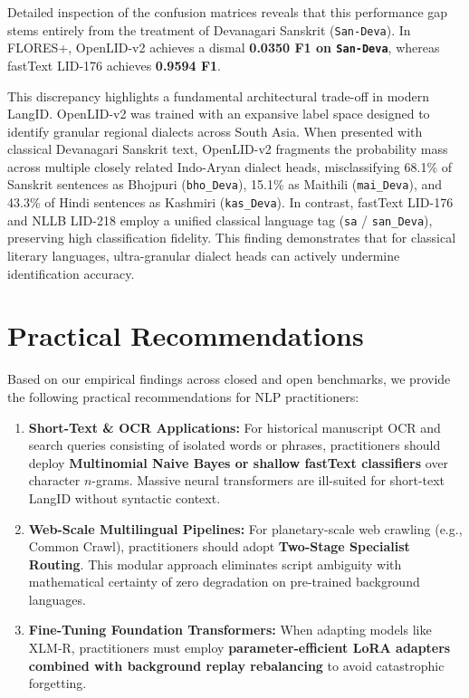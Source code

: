 \documentclass[11pt]{article}
\begin{document}
Detailed inspection of the confusion matrices reveals that this performance gap stems entirely from the treatment of Devanagari Sanskrit (\texttt{San-Deva}). In FLORES+, OpenLID-v2 achieves a dismal \textbf{0.0350 F1 on \texttt{San-Deva}}, whereas fastText LID-176 achieves \textbf{0.9594 F1}.

This discrepancy highlights a fundamental architectural trade-off in modern LangID. OpenLID-v2 was trained with an expansive label space designed to identify granular regional dialects across South Asia. When presented with classical Devanagari Sanskrit text, OpenLID-v2 fragments the probability mass across multiple closely related Indo-Aryan dialect heads, misclassifying 68.1\% of Sanskrit sentences as Bhojpuri (\texttt{bho\_Deva}), 15.1\% as Maithili (\texttt{mai\_Deva}), and 43.3\% of Hindi sentences as Kashmiri (\texttt{kas\_Deva}). In contrast, fastText LID-176 and NLLB LID-218 employ a unified classical language tag (\texttt{sa} / \texttt{san\_Deva}), preserving high classification fidelity. This finding demonstrates that for classical literary languages, ultra-granular dialect heads can actively undermine identification accuracy.

\section{Practical Recommendations}
Based on our empirical findings across closed and open benchmarks, we provide the following practical recommendations for NLP practitioners:
\begin{enumerate}
    \item \textbf{Short-Text \& OCR Applications:} For historical manuscript OCR and search queries consisting of isolated words or phrases, practitioners should deploy \textbf{Multinomial Naive Bayes or shallow fastText classifiers} over character $n$-grams. Massive neural transformers are ill-suited for short-text LangID without syntactic context.
    \item \textbf{Web-Scale Multilingual Pipelines:} For planetary-scale web crawling (e.g., Common Crawl), practitioners should adopt \textbf{Two-Stage Specialist Routing}. This modular approach eliminates script ambiguity with mathematical certainty of zero degradation on pre-trained background languages.
    \item \textbf{Fine-Tuning Foundation Transformers:} When adapting models like XLM-R, practitioners must employ \textbf{parameter-efficient LoRA adapters combined with background replay rebalancing} to avoid catastrophic forgetting.
\end{enumerate}
\end{document}
